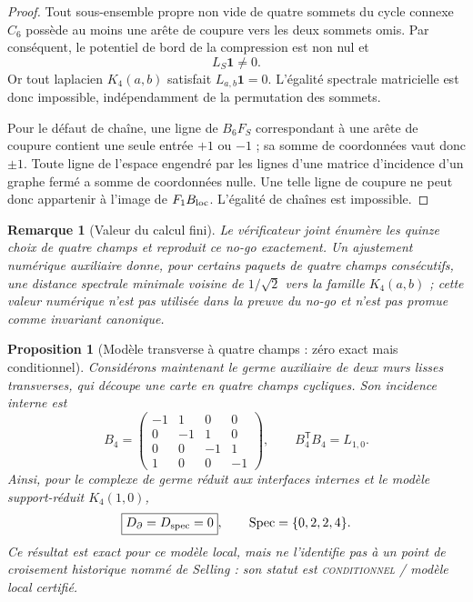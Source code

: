 \documentclass[11pt,a4paper]{article}
\newtheorem{proposition}[theorem]{Proposition}
\newtheorem{remark}[theorem]{Remarque}
\newcommand{\statusCond}{\textsc{conditionnel}}
\begin{document}
\begin{proof}
Tout sous-ensemble propre non vide de quatre sommets du cycle connexe $C_6$ possède au moins une arête de coupure vers les deux sommets omis. Par conséquent, le potentiel de bord de la compression est non nul et
\[
 L_S\mathbf1\ne0.
\]
Or tout laplacien $K_4(a,b)$ satisfait $L_{a,b}\mathbf1=0$. L'égalité spectrale matricielle est donc impossible, indépendamment de la permutation des sommets.

Pour le défaut de chaîne, une ligne de $B_6F_S$ correspondant à une arête de coupure contient une seule entrée $+1$ ou $-1$ ; sa somme de coordonnées vaut donc $\pm1$. Toute ligne de l'espace engendré par les lignes d'une matrice d'incidence d'un graphe fermé a somme de coordonnées nulle. Une telle ligne de coupure ne peut donc appartenir à l'image de $F_1B_{\rm loc}$. L'égalité de chaînes est impossible.
\end{proof}

\begin{remark}[Valeur du calcul fini]
Le vérificateur joint énumère les quinze choix de quatre champs et reproduit ce no-go exactement. Un ajustement numérique auxiliaire donne, pour certains paquets de quatre champs consécutifs, une distance spectrale minimale voisine de $1/\sqrt2$ vers la famille $K_4(a,b)$ ; cette valeur numérique n'est pas utilisée dans la preuve du no-go et n'est pas promue comme invariant canonique.
\end{remark}

\begin{proposition}[Modèle transverse à quatre champs : zéro exact mais conditionnel]\label{prop:X4-zero}
Considérons maintenant le germe auxiliaire de deux murs lisses transverses, qui découpe une carte en quatre champs cycliques. Son incidence interne est
\[
B_4=\begin{pmatrix}
-1&1&0&0\\
0&-1&1&0\\
0&0&-1&1\\
1&0&0&-1
\end{pmatrix},
\qquad
B_4^{\mathsf T}B_4=L_{1,0}.
\]
Ainsi, pour le complexe de germe réduit aux interfaces internes et le modèle support-réduit $K_4(1,0)$,
\[
 \boxed{D_\partial=D_{\rm spec}=0},
 \qquad
 \operatorname{Spec}=\{0,2,2,4\}.
\]
Ce résultat est exact pour ce modèle local, mais ne l'identifie pas à un point de croisement historique nommé de Selling : son statut est \statusCond{} / modèle local certifié.
\end{proposition}
\end{document}
